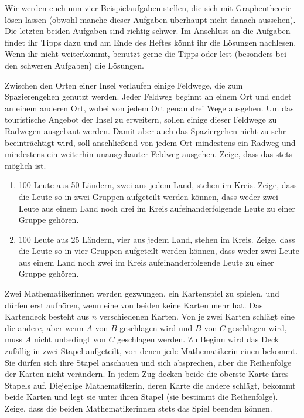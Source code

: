 Wir werden euch nun vier Beispielaufgaben stellen, die sich mit Graphentheorie lösen lassen (obwohl manche dieser Aufgaben überhaupt nicht danach aussehen). Die letzten beiden Aufgaben sind richtig schwer. Im Anschluss an die Aufgaben findet ihr Tipps dazu und am Ende des Heftes könnt ihr die Lösungen nachlesen. Wenn ihr nicht weiterkommt, benutzt gerne die Tipps oder lest (besonders bei den schweren Aufgaben) die Lösungen.
\begin{aufgabe*}\label{aufgabe:Feldwege}
	Zwischen den Orten einer Insel verlaufen einige Feldwege, die zum Spazierengehen genutzt werden. Jeder Feldweg beginnt an einem Ort und endet an einem anderen Ort, wobei von jedem Ort genau drei Wege ausgehen. Um das touristische Angebot der Insel zu erweitern, sollen einige dieser Feldwege zu Radwegen ausgebaut werden. Damit aber auch das Spaziergehen nicht zu sehr beeinträchtigt wird, soll anschließend von jedem Ort mindestens ein Radweg und mindestens ein weiterhin unausgebauter Feldweg ausgehen. Zeige, dass das stets möglich ist.
\end{aufgabe*}
\begin{aufgabe*}\label{aufgabe:50Laender}\leavevmode
	\begin{enumerate}
		\item 100 Leute aus 50 Ländern, zwei aus jedem Land, stehen im Kreis. Zeige, dass die Leute so in zwei Gruppen aufgeteilt werden können, dass weder zwei Leute aus einem Land noch drei im Kreis aufeinanderfolgende Leute zu einer Gruppe gehören.\label{teilaufgabe:50}
		\item 100 Leute aus 25 Ländern, vier aus jedem Land, stehen im Kreis. Zeige, dass die Leute so in vier Gruppen aufgeteilt werden können, dass weder zwei Leute aus einem Land noch zwei im Kreis aufeinanderfolgende Leute zu einer Gruppe gehören.\label{teilaufgabe:25}
	\end{enumerate}
\end{aufgabe*}
\begin{aufgabe*}[**]\label{aufgabe:Kartenspiel}
	Zwei Mathematikerinnen werden gezwungen, ein Kartenspiel zu spielen, und dürfen erst aufhören, wenn eine von beiden keine Karten mehr hat. Das Kartendeck besteht aus $n$ verschiedenen Karten. Von je zwei Karten schlägt eine die andere, aber wenn $A$ von $B$ geschlagen wird und $B$ von $C$ geschlagen wird, muss $A$ nicht unbedingt von $C$ geschlagen werden. Zu Beginn wird das Deck zufällig in zwei Stapel aufgeteilt, von denen jede Mathematikerin einen bekommt. Sie dürfen sich ihre Stapel anschauen und sich absprechen, aber die Reihenfolge der Karten nicht verändern. In jedem Zug decken beide die oberste Karte ihres Stapels auf. Diejenige Mathematikerin, deren Karte die andere schlägt, bekommt beide Karten und legt sie unter ihren Stapel (sie bestimmt die Reihenfolge). Zeige, dass die beiden Mathematikerinnen stets das Spiel beenden können.
\end{aufgabe*}

